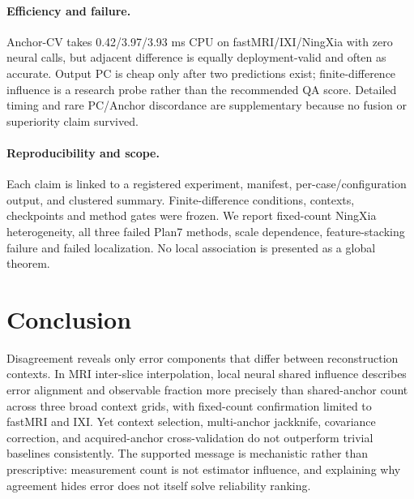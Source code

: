 \documentclass[10pt,twocolumn,letterpaper]{article}
\begin{document}
\paragraph{Efficiency and failure.} Anchor-CV takes 0.42/3.97/3.93 ms CPU on fastMRI/IXI/NingXia with zero neural calls, but adjacent difference is equally deployment-valid and often as accurate. Output PC is cheap only after two predictions exist; finite-difference influence is a research probe rather than the recommended QA score. Detailed timing and rare PC/Anchor discordance are supplementary because no fusion or superiority claim survived.

\paragraph{Reproducibility and scope.} Each claim is linked to a registered experiment, manifest, per-case/configuration output, and clustered summary. Finite-difference conditions, contexts, checkpoints and method gates were frozen. We report fixed-count NingXia heterogeneity, all three failed Plan7 methods, scale dependence, feature-stacking failure and failed localization. No local association is presented as a global theorem.

\section{Conclusion}
Disagreement reveals only error components that differ between reconstruction contexts. In MRI inter-slice interpolation, local neural shared influence describes error alignment and observable fraction more precisely than shared-anchor count across three broad context grids, with fixed-count confirmation limited to fastMRI and IXI. Yet context selection, multi-anchor jackknife, covariance correction, and acquired-anchor cross-validation do not outperform trivial baselines consistently. The supported message is mechanistic rather than prescriptive: measurement count is not estimator influence, and explaining why agreement hides error does not itself solve reliability ranking.

{\small


}
\end{document}
